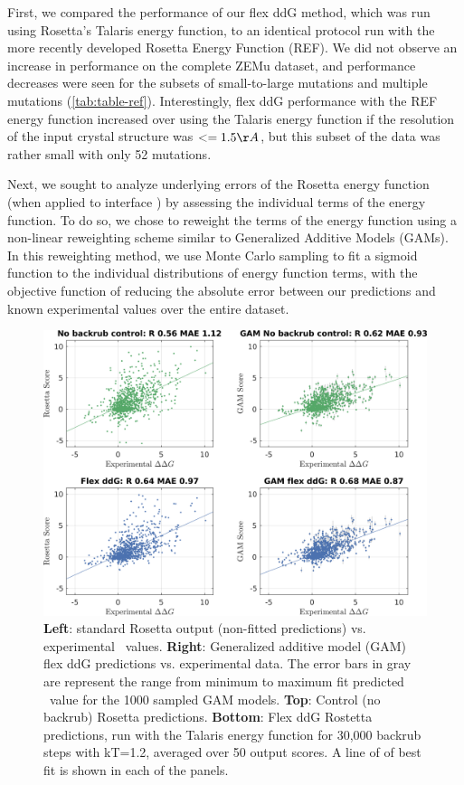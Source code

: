 First, we compared the performance of our flex ddG method, which was run using Rosetta's Talaris\cite{leaver-fay_chapter_2013,song_structure-guided_2011,shapovalov_smoothed_2011} energy function, to an identical protocol run with the more recently developed Rosetta Energy Function (REF)\cite{alford_rosetta_2017}. We did not observe an increase in performance on the complete ZEMu dataset, and performance decreases were seen for the subsets of small-to-large mutations and multiple mutations (\cref{tab:table-ref}). Interestingly, flex ddG performance with the REF energy function increased over using the Talaris energy function if the resolution of the input crystal structure was $<= 1.5 \AA$, but this subset of the data was rather small with only 52 mutations.

Next, we sought to analyze underlying errors of the Rosetta energy function (when applied to interface \ddg) by assessing the individual terms of the energy function. To do so, we chose to reweight the terms of the energy function using a non-linear reweighting scheme similar to Generalized Additive Models (GAMs)\cite{hastie_generalized_1990}.
In this reweighting method, we use Monte Carlo sampling to fit a sigmoid function to the individual distributions of energy function terms, with the objective function of reducing the absolute error between our predictions and known experimental values over the entire dataset.

\begin{figure}
  \includegraphics[width=\textwidth,keepaspectratio]{figures/zemu-sigmoid2-corrs-main.png}
  \caption[]{
    \textbf{Left}: standard Rosetta output (non-fitted predictions) vs. experimental \ddg\ values.
    \textbf{Right}: Generalized additive model (GAM) flex ddG predictions vs. experimental data.
    The error bars in gray are represent the range from minimum to maximum fit predicted \ddg\ value for the 1000 sampled GAM models.
    \textbf{Top}: Control (no backrub) Rosetta predictions.
    \textbf{Bottom}: Flex ddG Rostetta predictions, run with the Talaris energy function for 30,000 backrub steps with kT=1.2, averaged over 50 output scores.
    A line of of best fit is shown in each of the panels.
  } \label{fig:t14-fit-scatter-main}
\end{figure}

